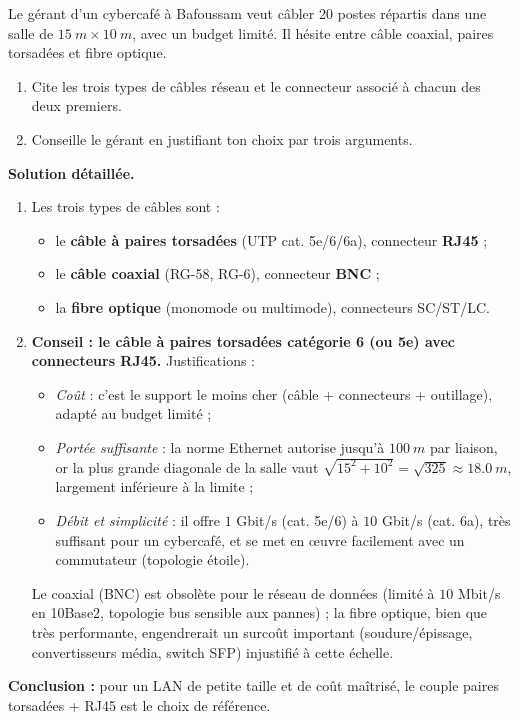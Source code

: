 \documentclass[11pt]{article}
\begin{document}
\begin{exoresolu}
Le gérant d'un cybercafé à Bafoussam veut câbler 20 postes répartis dans une salle de $\SI{15}{m} \times \SI{10}{m}$, avec un budget limité. Il hésite entre câble coaxial, paires torsadées et fibre optique.
\begin{enumerate}
  \item Cite les trois types de câbles réseau et le connecteur associé à chacun des deux premiers.
  \item Conseille le gérant en justifiant ton choix par trois arguments.
\end{enumerate}
\tcblower
\textbf{Solution détaillée.}
\begin{enumerate}
  \item Les trois types de câbles sont :
  \begin{itemize}
    \item le \textbf{câble à paires torsadées} (UTP cat. 5e/6/6a), connecteur \textbf{RJ45} ;
    \item le \textbf{câble coaxial} (RG-58, RG-6), connecteur \textbf{BNC} ;
    \item la \textbf{fibre optique} (monomode ou multimode), connecteurs SC/ST/LC.
  \end{itemize}
  \item \textbf{Conseil : le câble à paires torsadées catégorie 6 (ou 5e) avec connecteurs RJ45.} Justifications :
  \begin{itemize}
    \item \emph{Coût} : c'est le support le moins cher (câble + connecteurs + outillage), adapté au budget limité ;
    \item \emph{Portée suffisante} : la norme Ethernet autorise jusqu'à $\SI{100}{m}$ par liaison, or la plus grande diagonale de la salle vaut $\sqrt{15^2+10^2} = \sqrt{325} \approx \SI{18,0}{m}$, largement inférieure à la limite ;
    \item \emph{Débit et simplicité} : il offre $1$ Gbit/s (cat. 5e/6) à $10$ Gbit/s (cat. 6a), très suffisant pour un cybercafé, et se met en œuvre facilement avec un commutateur (topologie étoile).
  \end{itemize}
  Le coaxial (BNC) est obsolète pour le réseau de données (limité à $10$ Mbit/s en 10Base2, topologie bus sensible aux pannes) ; la fibre optique, bien que très performante, engendrerait un surcoût important (soudure/épissage, convertisseurs média, switch SFP) injustifié à cette échelle.
\end{enumerate}
\textbf{Conclusion :} pour un LAN de petite taille et de coût maîtrisé, le couple paires torsadées + RJ45 est le choix de référence.
\end{exoresolu}
\end{document}
